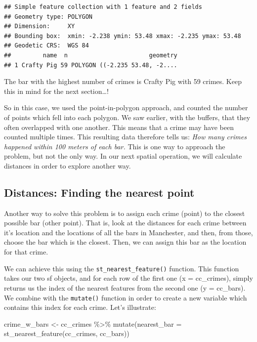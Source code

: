 \documentclass[
  krantz2]{krantz}
\makeatletter
\newenvironment{Shaded}{\begin{snugshade}}{\end{snugshade}}
\newcommand{\AttributeTok}[1]{\textcolor[rgb]{0.61,0.61,0.61}{#1}}
\newcommand{\FunctionTok}[1]{\textcolor[rgb]{0,0,0}{#1}}
\newcommand{\NormalTok}[1]{#1}
\newcommand{\OtherTok}[1]{\textcolor[rgb]{0.37,0.37,0.37}{#1}}
\newcommand{\SpecialCharTok}[1]{\textcolor[rgb]{0,0,0}{#1}}
\newenvironment{kframe}{%
\medskip{}
\setlength{\fboxsep}{.8em}
 \def\at@end@of@kframe{}%
 \ifinner\ifhmode%
  \def\at@end@of@kframe{\end{minipage}}%
  \begin{minipage}{\columnwidth}%
 \fi\fi%
 \def\FrameCommand##1{\hskip\@totalleftmargin \hskip-\fboxsep
 \colorbox{shadecolor}{##1}\hskip-\fboxsep
     \hskip-\linewidth \hskip-\@totalleftmargin \hskip\columnwidth}%
 \MakeFramed {\advance\hsize-\width
   \@totalleftmargin\z@ \linewidth\hsize
   \@setminipage}}%
 {\par\unskip\endMakeFramed%
 \at@end@of@kframe}
\renewenvironment{Shaded}{\begin{kframe}}{\end{kframe}}
\makeatother
\begin{document}
\begin{verbatim}
## Simple feature collection with 1 feature and 2 fields
## Geometry type: POLYGON
## Dimension:     XY
## Bounding box:  xmin: -2.238 ymin: 53.48 xmax: -2.235 ymax: 53.48
## Geodetic CRS:  WGS 84
##         name  n                       geometry
## 1 Crafty Pig 59 POLYGON ((-2.235 53.48, -2....
\end{verbatim}

The bar with the highest number of crimes is Crafty Pig with 59 crimes. Keep this in mind for the next section\ldots!

So in this case, we used the point-in-polygon approach, and counted the number of points which fell into each polygon. We saw earlier, with the buffers, that they often overlapped with one another. This means that a crime may have been counted multiple times. This resulting data therefore tells us: \emph{How many crimes happened within 100 meters of each bar.} This is one way to approach the problem, but not the only way. In our next spatial operation, we will calculate distances in order to explore another way.

\hypertarget{distances-finding-the-nearest-point}{%
\subsection{Distances: Finding the nearest point}\label{distances-finding-the-nearest-point}}

Another way to solve this problem is to assign each crime (point) to the closest possible bar (other point). That is, look at the distances for each crime between it's location and the locations of all the bars in Manchester, and then, from those, choose the bar which is the closest. Then, we can assign this bar as the location for that crime.

We can achieve this using the \texttt{st\_nearest\_feature()} function. This function takes our two sf objects, and for each row of the first one (x = cc\_crimes), simply returns us the index of the nearest features from the second one (y = cc\_bars). We combine with the \texttt{mutate()} function in order to create a new variable which contains this index for each crime. Let's illustrate:

\begin{Shaded}
\begin{Highlighting}[]
\NormalTok{crime\_w\_bars }\OtherTok{\textless{}{-}}\NormalTok{ cc\_crimes }\SpecialCharTok{\%\textgreater{}\%} 
  \FunctionTok{mutate}\NormalTok{(}\AttributeTok{nearest\_bar =} \FunctionTok{st\_nearest\_feature}\NormalTok{(cc\_crimes, cc\_bars))}
\end{Highlighting}
\end{Shaded}
\end{document}
